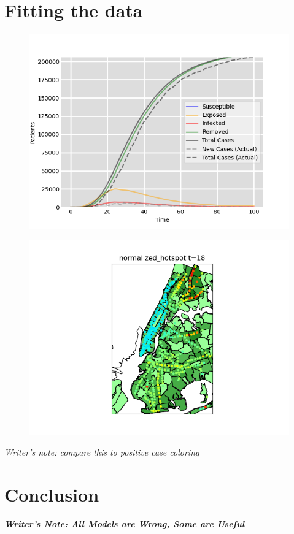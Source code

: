 \documentclass[12pt, a4, epsf] {article}
\theoremstyle{plain}
\theoremstyle{definition}
\begin{document}
\section*{Fitting the data}
\FloatBarrier
\begin{figure}[htbp]
\includegraphics[width = 1.0\textwidth]{Scratch_Visuals/SEIR_Curve_NYC_2.png}
\end{figure}
\begin{figure}[htbp]
\includegraphics[width = 1.0\textwidth]{Scratch_Visuals/NYC_time018.png}
\end{figure}
\FloatBarrier
\textit{Writer's note: compare this to positive case coloring}
\section*{Conclusion}
\textbf{\textit{Writer's Note: All Models are Wrong, Some are Useful}}
\nocite{*}
{}

\end{document}
